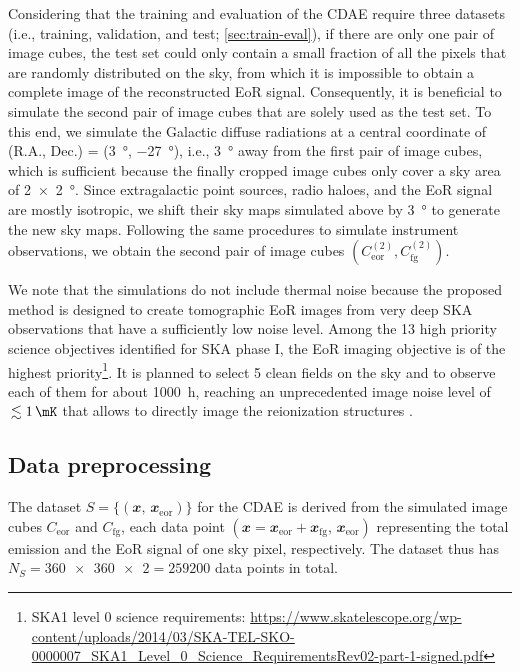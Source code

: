 \documentclass[fleqn,usenatbib]{mnras}
\newcommand{\R}[1]{\mathrm{#1}}
\newcommand{\B}[1]{\mathbfit{#1}}
\newcommand{\editone}[1]{{\leavevmode\color{cyan}#1}}
\begin{document}
\editone{%
Considering that the training and evaluation of the CDAE require three
datasets (i.e., training, validation, and test; \autoref{sec:train-eval}),
if there are only one pair of image cubes, the test set could only contain
a small fraction of all the pixels that are randomly distributed on the
sky, from which it is impossible to obtain a complete image of the
reconstructed EoR signal.
Consequently, it is beneficial to simulate the second pair of image cubes
that are solely used as the test set.
To this end, we simulate the Galactic diffuse radiations at a central
coordinate of (R.A., Dec\@.) = (\SI{3}{\degree}, \SI{-27}{\degree}), i.e.,
\SI{3}{\degree} away from the first pair of image cubes, which is
sufficient because the finally cropped image cubes only cover a sky area of
\SI{2 x 2}{\degree}.
Since extragalactic point sources, radio haloes, and the EoR signal are
mostly isotropic, we shift their sky maps simulated above by
\SI{3}{\degree} to generate the new sky maps.
Following the same procedures to simulate instrument observations, we
obtain the second pair of image cubes
$\left( C_{\R{eor}}^{(2)}, C_{\R{fg}}^{(2)} \right)$.

We note that the simulations do not include thermal noise because the
proposed method is designed to create tomographic EoR images from very deep
SKA observations that have a sufficiently low noise level.
Among the 13 high priority science objectives identified for SKA phase I,
the EoR imaging objective is of the highest priority\footnote{\raggedright%
  SKA1 level 0 science requirements:
  \url{https://www.skatelescope.org/wp-content/uploads/2014/03/SKA-TEL-SKO-0000007_SKA1_Level_0_Science_RequirementsRev02-part-1-signed.pdf}}.
It is planned to select 5 clean fields on the sky and to observe each of
them for about \SI{1000}{\hour}, reaching an unprecedented image noise
level of $\,\lesssim \SI{1}{\mK}$ that allows to directly image the
reionization structures
\citep[e.g.,][]{mellema2013rev,mellema2015,koopmans2015rev}.
} %


\subsection{Data preprocessing}
\label{sec:preprocessing}

The dataset $S = \{(\B{x}, \,\B{x}_{\R{eor}})\}$ for the CDAE is derived
from the simulated image cubes $C_{\R{eor}}$ and $C_{\R{fg}}$, each data
point $(\B{x} = \B{x}_{\R{eor}} + \B{x}_{\R{fg}}, \,\B{x}_{\R{eor}})$
representing the total emission and the EoR signal of one sky pixel,
respectively.
\editone{%
The dataset thus has $N_S = \num{360x360 x 2} = \num{259200}$
data points in total.}
\end{document}
